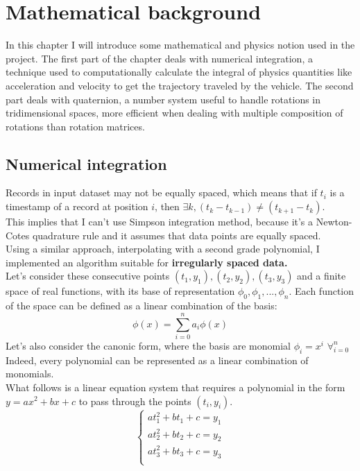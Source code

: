 \chapter{Mathematical background}
\label{chap:math_background}

In this chapter I will introduce some mathematical and physics notion used in the project.
The first part of the chapter deals with numerical integration, a technique used to computationally calculate the integral of physics quantities like acceleration and velocity to get the trajectory traveled by the vehicle.
The second part deals with quaternion, a number system useful to handle rotations in tridimensional spaces, more efficient when dealing with multiple composition of rotations than rotation matrices.
\\
\section{Numerical integration}
Records in input dataset may not be equally spaced, which means that if $t_i$ is a timestamp of a record at position $i$, then $\exists k, (t_{k}-t_{k-1})\neq (t_{k+1}-t_k)$. \\
This implies that I can't use Simpson integration method, because it's a Newton-Cotes quadrature rule and it assumes that data points are equally spaced. \cite{casciola} \\
Using a similar approach, interpolating with a second grade polynomial, I implemented an algorithm suitable for \textbf{irregularly spaced data.} \cite{integrating-irregularly} \\
Let's consider these consecutive points $(t_1,y_1),(t_2,y_2),(t_3,y_3)$ and a finite space of real functions, with its base of representation $\phi_0,\phi_1,...,\phi_n$.
Each function of the space can be defined as a linear combination of the basis:
$$ \phi(x) = \sum_{i=0}^n a_i \phi (x)$$ 
Let's also consider the canonic form, where the basis are monomial $\phi_i=x^i$ $\forall_{i=0}^n$ \\
Indeed, every polynomial can be represented as a linear combination of monomials. \\
What follows is a linear equation system that requires a polynomial in the form $y=ax^2+bx+c$ to pass through the points $(t_i,y_i)$.
$$
\begin{cases}
at_1^2 + bt_1 + c = y_1 \\
at_2^2 + bt_2 + c = y_2 \\
at_3^2 + bt_3 + c = y_3 \\
\end{cases}
$$
